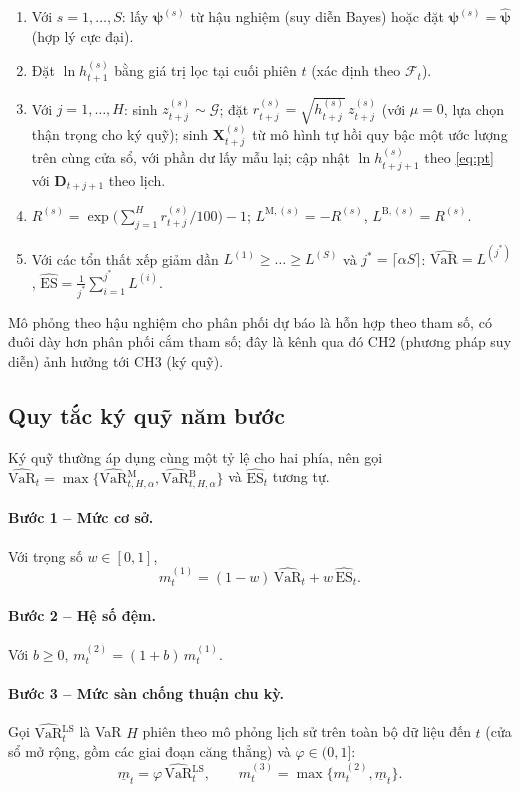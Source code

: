 \documentclass[12pt,a4paper]{article}
\theoremstyle{definition}
\theoremstyle{remark}
\newcommand{\VaR}{\mathrm{VaR}}
\newcommand{\ES}{\mathrm{ES}}
\newcommand{\Fcal}{\mathcal{F}}
\newcommand{\Gcal}{\mathcal{G}}
\newcommand{\bpsi}{\boldsymbol{\psi}}
\newcommand{\bX}{\mathbf{X}}
\newcommand{\bD}{\mathbf{D}}
\begin{document}
\begin{enumerate}
\item Với $s=1,\dots,S$: lấy $\bpsi^{(s)}$ từ hậu nghiệm (suy diễn Bayes) hoặc đặt $\bpsi^{(s)}=\hat{\bpsi}$ (hợp lý cực đại).
\item Đặt $\ln h^{(s)}_{t+1}$ bằng giá trị lọc tại cuối phiên $t$ (xác định theo $\Fcal_t$).
\item Với $j=1,\dots,H$: sinh $z^{(s)}_{t+j}\sim\Gcal$; đặt $r^{(s)}_{t+j}=\sqrt{h^{(s)}_{t+j}}\,z^{(s)}_{t+j}$ (với $\mu=0$, lựa chọn thận trọng cho ký quỹ); sinh $\bX^{(s)}_{t+j}$ từ mô hình tự hồi quy bậc một ước lượng trên cùng cửa sổ, với phần dư lấy mẫu lại; cập nhật $\ln h^{(s)}_{t+j+1}$ theo \eqref{eq:pt} với $\bD_{t+j+1}$ theo lịch.
\item $R^{(s)}=\exp\!\big(\sum_{j=1}^{H}r^{(s)}_{t+j}/100\big)-1$; $L^{\mathrm M,(s)}=-R^{(s)}$, $L^{\mathrm B,(s)}=R^{(s)}$.
\item Với các tổn thất xếp giảm dần $L^{(1)}\ge\dots\ge L^{(S)}$ và $j^\ast=\lceil\alpha S\rceil$: $\widehat{\VaR}=L^{(j^\ast)}$, $\widehat{\ES}=\frac1{j^\ast}\sum_{i=1}^{j^\ast}L^{(i)}$.
\end{enumerate}

Mô phỏng theo hậu nghiệm cho phân phối dự báo là hỗn hợp theo tham số, có đuôi dày hơn phân phối cắm tham số; đây là kênh qua đó CH2 (phương pháp suy diễn) ảnh hưởng tới CH3 (ký quỹ).

\subsection{Quy tắc ký quỹ năm bước}\label{sec:quytac}

Ký quỹ thường áp dụng cùng một tỷ lệ cho hai phía, nên gọi $\widehat{\VaR}_t=\max\{\widehat{\VaR}{}^{\mathrm M}_{t,H,\alpha},\widehat{\VaR}{}^{\mathrm B}_{t,H,\alpha}\}$ và $\widehat{\ES}_t$ tương tự.

\paragraph{Bước 1 -- Mức cơ sở.} Với trọng số $w\in[0,1]$,
\begin{equation}
m^{(1)}_t=(1-w)\,\widehat{\VaR}_t+w\,\widehat{\ES}_t .
\end{equation}
\paragraph{Bước 2 -- Hệ số đệm.} Với $b\ge0$, $m^{(2)}_t=(1+b)\,m^{(1)}_t$.
\paragraph{Bước 3 -- Mức sàn chống thuận chu kỳ.} Gọi $\widehat{\VaR}{}^{\mathrm{LS}}_t$ là VaR $H$ phiên theo mô phỏng lịch sử trên toàn bộ dữ liệu đến $t$ (cửa sổ mở rộng, gồm các giai đoạn căng thẳng) và $\varphi\in(0,1]$:
\begin{equation}
\underline{m}_t=\varphi\,\widehat{\VaR}{}^{\mathrm{LS}}_t,\qquad m^{(3)}_t=\max\{m^{(2)}_t,\underline{m}_t\}.
\end{equation}
\end{document}
